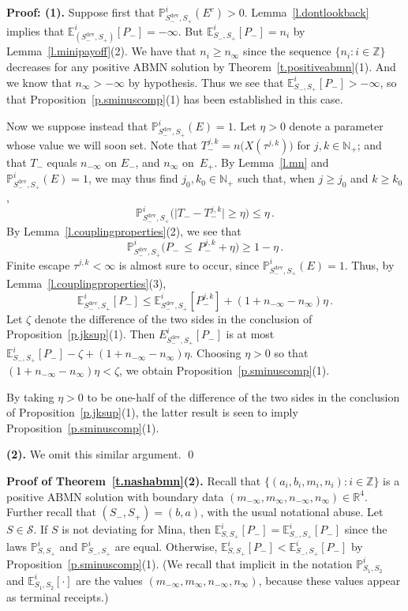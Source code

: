 \documentclass[letterpaper,11pt,oneside,reqno]{amsbook}
\newcommand{\PP}{\ensuremath{\mathbb{P}}}
\newcommand{\N}{\ensuremath{\mathbb{N}}}
\newcommand{\R}{\ensuremath{\mathbb{R}}}
\newcommand{\Z}{\ensuremath{\mathbb{Z}}}
\newcommand{\E}[0]{\mathbb{E}}
\numberwithin{figure}{chapter}
\theoremstyle{definition}
\theoremstyle{definition}
\theoremstyle{definition}
\theoremstyle{definition}
\theoremstyle{definition}
\newcommand{\mc}{\mathcal}
\newcommand{\nwithoutzero}{\N_+}
\newcommand\pgameplay[3]{\PP^{#3}_{#1,#2}}
\newcommand\egameplay[3]{\E^{#3}_{#1,#2}}
\newcommand{\abmnmacspace}{\textrm{ABMN} }
\newcommand{\sdev}{S_-^{\textrm{dev}}}
\begin{document}
{\bf Proof: (1).}
Suppose first that $\PP_{\sdev,S_+}^i(E^c) > 0$. 
Lemma~\ref{l.dontlookback} implies that 
$\E_{(\sdev,S_+)}^i [P_-]  = -\infty$. But  $ \E_{S_-,S_+}^i [P_-]  = n_i$ by Lemma~\ref{l.minipayoff}(2). We have  that $n_i \geq n_\infty$
since the sequence $\big\{ n_i: i \in \Z \big\}$ decreases for any positive \abmnmacspace solution by Theorem~\ref{t.positiveabmn}(1). And we know that $n_\infty > -\infty$ by hypothesis.
Thus we see that   $ \E_{S_-,S_+}^i [P_-]  > -\infty$, so that  Proposition~\ref{p.sminuscomp}(1) has been established in this case.

Now we suppose instead  that $\PP_{\sdev,S_+}^i(E) = 1$. 
Let $\eta > 0$ denote a parameter whose value we will soon set.
Note that $T_-^{j,k} = n\big(X(\tau^{j,k})  \big)$ for $j,k \in \nwithoutzero$; and that $T_-$ equals $n_{-\infty}$ on $E_-$, and $n_\infty$ on~$E_+$.
By Lemma~\ref{l.mn} and  $\PP_{\sdev,S_+}^i(E) = 1$,
we may thus find   $j_0,k_0 \in \nwithoutzero$ such that, when $j \geq j_0$ and $k \geq k_0$,
$$
\PP_{\sdev,S_+}^i \Big( \big\vert  T_-  - T_-^{j,k} \big\vert \geq \eta \Big) \leq \eta \, .
$$
By Lemma~\ref{l.couplingproperties}(2), we see that
$$
\PP_{\sdev,S_+}^i \Big( P_-  \, \leq \, P^{j,k}_-   + \eta \Big) \geq 1 - \eta  \, .
$$
Finite escape $\tau^{j,k} < \infty$ is almost sure to occur, since  $\PP_{\sdev,S_+}^i(E) = 1$. Thus, by Lemma~\ref{l.couplingproperties}(3),  
$$
\E_{\sdev,S_+}^i [P_-] \leq  \E_{\sdev,S_+}^i  [P^{j,k}_-]  + (1+n_{-\infty}- n_\infty)\eta \, .
$$
Let $\zeta$ denote  the difference of the two sides in the conclusion of Proposition~\ref{p.jksup}(1). Then
$E_{\sdev,S_+}^i [P_-]$ is at most  $\E_{S_-,S_+}^i  [P_-] - \zeta  + (1+n_{-\infty}- n_\infty)\eta$. Choosing $\eta > 0$ so that  $(1+n_{-\infty}- n_\infty)\eta < \zeta$, we obtain  Proposition~\ref{p.sminuscomp}(1). 


 By taking $\eta > 0$ to be one-half of the difference of the two sides in the conclusion of Proposition~\ref{p.jksup}(1), the latter result is seen to imply Proposition~\ref{p.sminuscomp}(1). 
 
 {\bf (2).} We omit this similar argument. \qed


 {\bf Proof of Theorem~\ref{t.nashabmn}(2).}
Recall that $\big\{ (a_i,b_i,m_i,n_i): i \in \Z \big\}$ is a positive \abmnmacspace solution
with boundary data $(m_{-\infty},m_\infty,n_{-\infty},n_\infty) \in \R^4$.
 Further recall that $(S_-,S_+) = (b,a)$, with the usual notational abuse. Let $S \in \mc{S}$.
If $S$ is not deviating for Mina, then $\egameplay{S}{S_+}{i} [P_-] = \egameplay{S_-}{S_+}{i} [P_-]$ 
since the laws $\pgameplay{S}{S_+}{i}$ and $\pgameplay{S_-}{S_+}{i}$ are equal.
Otherwise,  $\egameplay{S}{S_+}{i}[P_-] < \egameplay{S_-}{S_+}{i} [P_-]$ by Proposition~\ref{p.sminuscomp}(1). (We recall that implicit in the notation $\pgameplay{S_1}{S_2}{i}$ and $\egameplay{S_1}{S_2}{i}[\cdot]$ are the values $(m_{-\infty},m_\infty,n_{-\infty},n_\infty)$, because these values appear as terminal receipts.)
\end{document}
